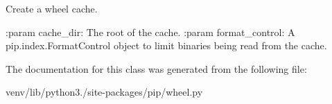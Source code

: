 \begin{DoxyVerb}Create a wheel cache.

:param cache_dir: The root of the cache.
:param format_control: A pip.index.FormatControl object to limit
    binaries being read from the cache.
\end{DoxyVerb}
 

The documentation for this class was generated from the following file\+:\begin{DoxyCompactItemize}
\item 
venv/lib/python3./site-\/packages/pip/wheel.\+py\end{DoxyCompactItemize}
